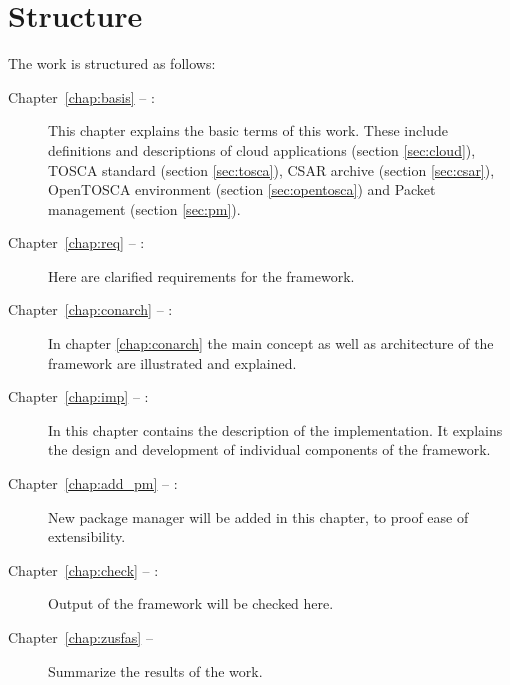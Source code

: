 \section*{Structure}
The work is structured as follows:
\begin{description}
\item[Chapter~\ref{chap:basis} -- :] This chapter explains the basic terms of this work. These include definitions and descriptions of cloud applications (section \ref{sec:cloud}), TOSCA standard (section \ref{sec:tosca}), CSAR archive (section \ref{sec:csar}), OpenTOSCA environment  (section \ref{sec:opentosca}) and Packet management (section \ref{sec:pm}).
\item[Chapter~\ref{chap:req} -- :] Here are clarified requirements for the framework.
\item[Chapter~\ref{chap:conarch} -- :] In chapter \ref{chap:conarch} the main concept as well as architecture of the framework are illustrated and explained.
\item[Chapter~\ref{chap:imp} -- :] In this chapter contains the description of the implementation. It explains the design and development of individual components of the framework. 
\item[Chapter~\ref{chap:add_pm} -- :] New package manager will be added in this chapter, to proof ease of extensibility. 
\item[Chapter~\ref{chap:check} -- :] Output of the framework will be checked here.
\item[Chapter~\ref{chap:zusfas} -- ] Summarize the results of the work.
\end{description}
